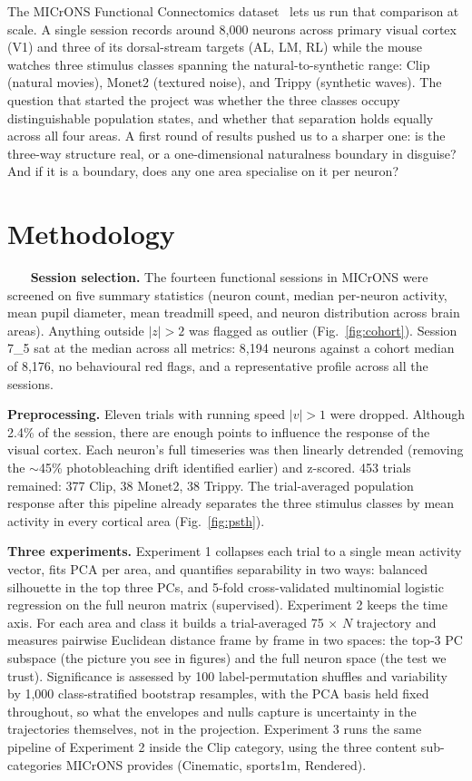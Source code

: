 \documentclass[11pt,a4paper]{article}
\begin{document}
The MICrONS Functional Connectomics dataset~\cite{microns2025} lets us run that comparison at scale. A single session records around 8{,}000 neurons across primary visual cortex (V1) and three of its dorsal-stream targets (AL, LM, RL) while the mouse watches three stimulus classes spanning the natural-to-synthetic range: Clip (natural movies), Monet2 (textured noise), and Trippy (synthetic waves). The question that started the project was whether the three classes occupy distinguishable population states, and whether that separation holds equally across all four areas. A first round of results pushed us to a sharper one: is the three-way structure real, or a one-dimensional naturalness boundary in disguise? And if it is a boundary, does any one area specialise on it per neuron?

\section{Methodology}

$\quad$ \ \textbf{Session selection.} The fourteen functional sessions in MICrONS were screened on five summary statistics (neuron count, median per-neuron activity, mean pupil diameter, mean treadmill speed, and neuron distribution across brain areas). Anything outside $|z|>2$ was flagged as outlier (Fig.~\ref{fig:cohort}). Session 7\_5 sat at the median across all metrics: 8{,}194 neurons against a cohort median of 8{,}176, no behavioural red flags, and a representative profile across all the sessions.

\textbf{Preprocessing.} Eleven trials with running speed $|v|>1$ were dropped. Although 2.4\% of the session, there are enough points to influence the response of the visual cortex. Each neuron's full timeseries was then linearly detrended (removing the $\sim$45\% photobleaching drift identified earlier) and z-scored. 453 trials remained: 377 Clip, 38 Monet2, 38 Trippy. The trial-averaged population response after this pipeline already separates the three stimulus classes by mean activity in every cortical area (Fig.~\ref{fig:psth}).

\textbf{Three experiments.} Experiment 1 collapses each trial to a single mean activity vector, fits PCA per area, and quantifies separability in two ways: balanced silhouette in the top three PCs, and 5-fold cross-validated multinomial logistic regression on the full neuron matrix (supervised). Experiment 2 keeps the time axis. For each area and class it builds a trial-averaged 75 $\times$ $N$ trajectory and measures pairwise Euclidean distance frame by frame in two spaces: the top-3 PC subspace (the picture you see in figures) and the full neuron space (the test we trust). Significance is assessed by 100 label-permutation shuffles and variability by 1{,}000 class-stratified bootstrap resamples, with the PCA basis held fixed throughout, so what the envelopes and nulls capture is uncertainty in the trajectories themselves, not in the projection. Experiment 3 runs the same pipeline of Experiment 2 inside the Clip category, using the three content sub-categories MICrONS provides (Cinematic, sports1m, Rendered).
\end{document}
